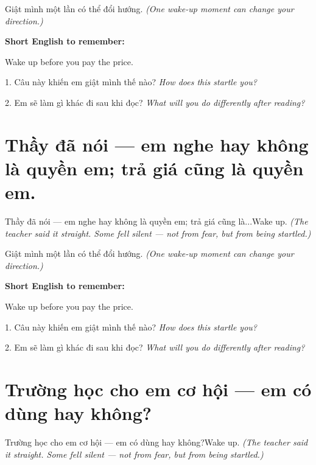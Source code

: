 \begin{baihoc}
Giật mình một lần có thể đổi hướng.
\textit{(One wake-up moment can change your direction.)}
\end{baihoc}

\begin{ghinhoanh}
\textbf{Short English to remember:}

Wake up before you pay the price.

\end{ghinhoanh}

\begin{tuhocnhanh}
1. Câu này khiến em giật mình thế nào? \textit{How does this startle you?}

2. Em sẽ làm gì khác đi sau khi đọc? \textit{What will you do differently after reading?}
\end{tuhocnhanh}
\ngancach


\section{Thầy đã nói — em nghe hay không là quyền em; trả giá cũng là quyền em.}
\begin{truyen}{Thầy đã nói — em nghe hay không là quyền em; trả giá cũng là...}{Wake up.}
\textit{(The teacher said it straight. Some fell silent — not from fear, but from being startled.)}
\end{truyen}

\begin{baihoc}
Giật mình một lần có thể đổi hướng.
\textit{(One wake-up moment can change your direction.)}
\end{baihoc}

\begin{ghinhoanh}
\textbf{Short English to remember:}

Wake up before you pay the price.

\end{ghinhoanh}

\begin{tuhocnhanh}
1. Câu này khiến em giật mình thế nào? \textit{How does this startle you?}

2. Em sẽ làm gì khác đi sau khi đọc? \textit{What will you do differently after reading?}
\end{tuhocnhanh}
\ngancach


\section{Trường học cho em cơ hội — em có dùng hay không?}
\begin{truyen}{Trường học cho em cơ hội — em có dùng hay không?}{Wake up.}
\textit{(The teacher said it straight. Some fell silent — not from fear, but from being startled.)}
\end{truyen}

